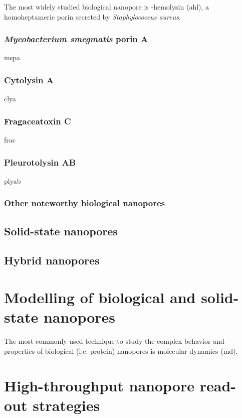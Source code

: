 The most widely studied biological nanopore is \textalpha-hemolysin (\gls{ahl}), a homoheptameric porin secreted by \textit{Staphylococcus aureus}.

\subsubsection{\textit{Mycobacterium smegmatis} porin A}

\gls{mspa}

\subsubsection{Cytolysin A}

\gls{clya}

\subsubsection{Fragaceatoxin C}

\gls{frac}

\subsubsection{Pleurotolysin AB}

\gls{plyab}

\subsubsection{Other noteworthy biological nanopores}

\subsection{Solid-state nanopores}

\subsection{Hybrid nanopores}



\section{Modelling of biological and solid-state nanopores}
The most commonly used technique to study the complex behavior and properties of biological (i.e. protein) nanopores is molecular dynamics (\gls{md}).

\section{High-throughput nanopore read-out strategies}



